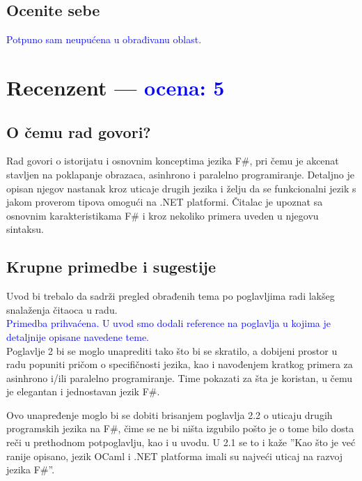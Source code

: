 \documentclass[a4paper]{report}
\newcommand{\odgovor}[1]{\textcolor{blue}{#1}}
\begin{document}
\section{Ocenite sebe}

\odgovor{Potpuno sam neupućena u obrađivanu oblast.}


\chapter{Recenzent \odgovor{--- ocena: 5} }


\section{O čemu rad govori?}
Rad govori o istorijatu i osnovnim konceptima jezika F\#, pri čemu je akcenat stavljen 
na poklapanje obrazaca, asinhrono i paralelno programiranje. Detaljno je opisan njegov
nastanak kroz uticaje drugih jezika i želju da se 
funkcionalni jezik s jakom proverom tipova omogući na .NET platformi.
Čitalac je upoznat sa osnovnim karakteristikama F\# i kroz nekoliko primera
uveden u njegovu sintaksu.


\section{Krupne primedbe i sugestije}
Uvod bi trebalo da sadrži pregled obrađenih tema po poglavljima 
radi lakšeg snalaženja čitaoca u radu.
\\ \odgovor {Primedba prihvaćena. U uvod smo dodali reference na poglavlja u kojima je detaljnije opisane navedene teme.} \\
Poglavlje 2 bi se moglo unaprediti tako što bi se skratilo, 
a dobijeni prostor u radu popuniti pričom o specifičnosti jezika,
kao i navođenjem kratkog primera za asinhrono i/ili paralelno programiranje. 
Time pokazati za šta je koristan, u čemu je elegantan i jednostavan jezik F\#.

Ovo unapređenje moglo bi se dobiti brisanjem poglavlja 2.2 o uticaju drugih 
programskih jezika na F\#, čime se ne bi ništa izgubilo
pošto je o tome bilo dosta reči u prethodnom potpoglavlju,
kao i u uvodu. U 2.1 se to i kaže ''Kao što je već ranije opisano, jezik OCaml i .NET platforma imali su najveći uticaj na razvoj jezika F\#''.
\end{document}
